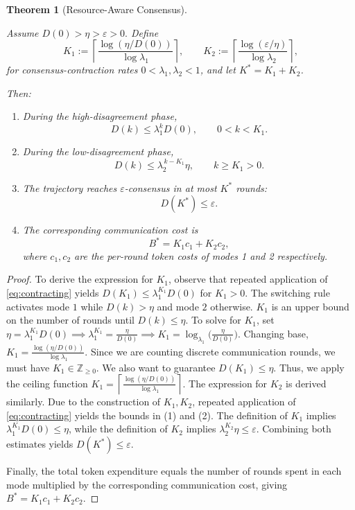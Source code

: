 \documentclass[journal,twoside,web]{ieeecolor_no_firstpage_logo}
\newtheorem{theorem}{Theorem}
\begin{document}
\begin{theorem}[Resource-Aware Consensus]
\label{thm:rac}

Assume $ D(0)>\eta>\varepsilon>0.$ Define
\begin{equation}
K_1
:=
\left\lceil
\frac{\log(\eta/D(0))}
{\log\lambda_1}
\right\rceil,
\qquad
K_2
:=
\left\lceil
\frac{\log(\varepsilon/\eta)}
{\log\lambda_2}
\right\rceil,
\label{eq:Ks}
\end{equation}
for consensus-contraction rates $0< \lambda_1, \lambda_2 < 1 $,
and let $K^* = K_1+K_2$.


Then:

\begin{enumerate}
\item
During the high-disagreement phase,
\[
D(k)
\le
\lambda_1^kD(0),
\qquad
0< k < K_1.
\]

\item
During the low-disagreement phase,
\[
D(k)
\le
\lambda_2^{\,k-K_1}\eta,
\qquad
k\geq K_1>0.
\]

\item
The trajectory reaches
$\varepsilon$-consensus in at most $K^*$ rounds:
\[
D(K^*)
\le
\varepsilon.
\]

\item
The corresponding communication cost is
\[
B^*
=
K_1c_1+K_2c_2,
\] where $c_1,c_2$ are the per-round token costs of modes 1 and 2 respectively.
\end{enumerate}

\end{theorem}

\begin{proof}
To derive the expression for $K_1$, observe that repeated application of \eqref{eq:contracting} yields $D(K_1) \leq \lambda_1^{K_1}D(0)$ for $K_1 > 0.$
The switching rule activates mode $1$ while
$D(k)>\eta$ and mode $2$ otherwise.
$K_1$ is an upper bound on the number of rounds until $D(k) \leq \eta$. To solve for $K_1$, set $\eta = \lambda_1^{K_1}D(0) \implies \lambda_1^{K_1} = \frac{\eta}{D(0)} \implies K_1 = \log_{\lambda_1}\Big(\frac{\eta}{D(0)} \Big)$. Changing base, $K_1 = \frac{\log (\eta / D(0))}{\log \lambda_1}$. Since we are counting discrete communication rounds, we must have $K_1 \in \mathbb{Z}_{\geq 0}$. We also want to guarantee $D(K_1) \leq \eta $. Thus, we apply the ceiling function $K_1
=
\left\lceil
\frac{\log(\eta/D(0))}
{\log\lambda_1}
\right\rceil.$
The expression for $K_2$ is derived similarly. Due to the construction of $K_1,K_2$, repeated application of \eqref{eq:contracting} yields the bounds in (1) and (2).  The definition of $K_1$ implies
$ \lambda_1^{K_1}D(0)\le\eta$, while the definition of $K_2$ implies $ \lambda_2^{K_2}\eta\le\varepsilon$.
Combining both estimates yields $D(K^*)\le\varepsilon$.

Finally, the total token expenditure equals the number of rounds
spent in each mode multiplied by the corresponding communication cost,
giving $B^*=K_1c_1+K_2c_2$.

\end{proof}
\end{document}
